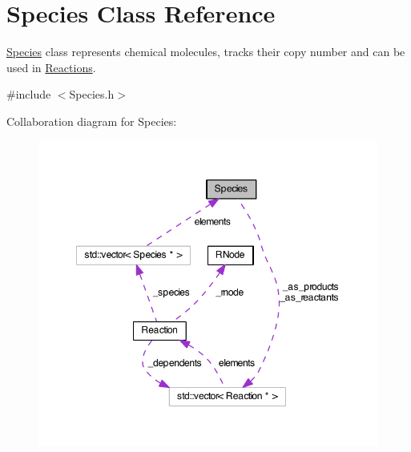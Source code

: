 \hypertarget{classSpecies}{\section{Species Class Reference}
\label{classSpecies}
}


\hyperlink{classSpecies}{Species} class represents chemical molecules, tracks their copy number and can be used in \hyperlink{classReaction}{Reactions}.  




{\ttfamily \#include $<$Species.\-h$>$}



Collaboration diagram for Species\-:\nopagebreak
\begin{figure}[H]
\begin{center}
\leavevmode
\includegraphics[width=350pt]{classSpecies__coll__graph}
\end{center}
\end{figure}
